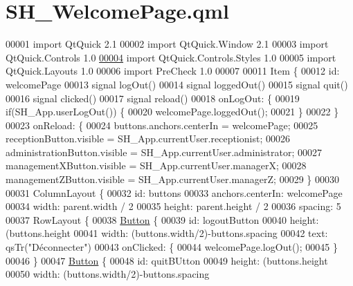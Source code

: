 \hypertarget{SH__WelcomePage_8qml}{\section{S\-H\-\_\-\-Welcome\-Page.\-qml}
\label{SH__WelcomePage_8qml}
}

\begin{DoxyCode}
00001 \textcolor{keyword}{import} QtQuick 2.1
00002 import QtQuick.Window 2.1
00003 import QtQuick.Controls 1.0
\hypertarget{SH__WelcomePage_8qml_source_l00004}{}\hyperlink{classSH__WelcomePage}{00004} import QtQuick.Controls.Styles 1.0
00005 import QtQuick.Layouts 1.0
00006 import PreCheck 1.0
00007 
00011 Item \{
00012     \textcolor{keywordtype}{id}: welcomePage
00013     signal logOut()
00014     signal loggedOut()
00015     signal quit()
00016     signal clicked()
00017     signal reload()
00018     onLogOut: \{
00019         \textcolor{keywordflow}{if}(SH\_App.userLogOut()) \{
00020             welcomePage.loggedOut();
00021         \}
00022     \}
00023     onReload: \{
00024         buttons.anchors.centerIn = welcomePage;
00025         receptionButton.visible = SH\_App.currentUser.receptionist;
00026         administrationButton.visible = SH\_App.currentUser.administrator;
00027         managementXButton.visible = SH\_App.currentUser.managerX;
00028         managementZButton.visible = SH\_App.currentUser.managerZ;
00029     \}
00030 
00031     ColumnLayout \{
00032         \textcolor{keywordtype}{id}: buttons
00033         anchors.centerIn: welcomePage
00034         width: parent.width / 2
00035         height: parent.height / 2
00036         spacing: 5
00037         RowLayout \{
00038             \hyperlink{classButton}{Button} \{
00039                 \textcolor{keywordtype}{id}: logoutButton
00040                 height: (buttons.height%
00041                 width: (buttons.width/2)-buttons.spacing
00042                 text: qsTr(\textcolor{stringliteral}{"Déconnecter"})
00043                 onClicked: \{
00044                     welcomePage.logOut();
00045                 \}
00046             \}
00047             \hyperlink{classButton}{Button} \{
00048                 \textcolor{keywordtype}{id}: quitBUtton
00049                 height: (buttons.height%
00050                 width: (buttons.width/2)-buttons.spacing

\end{DoxyCode}
